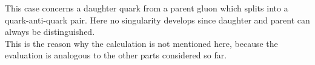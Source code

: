 This case concerns a daughter quark from a parent gluon which splits into a quark-anti-quark pair. Here no singularity develops since daughter and parent can always be distinguished.\\
This is the reason why the calculation is not mentioned here, because the evaluation is analogous to the other parts considered so far.
\pagebreak
%
%
%
%
%
%
%
%
